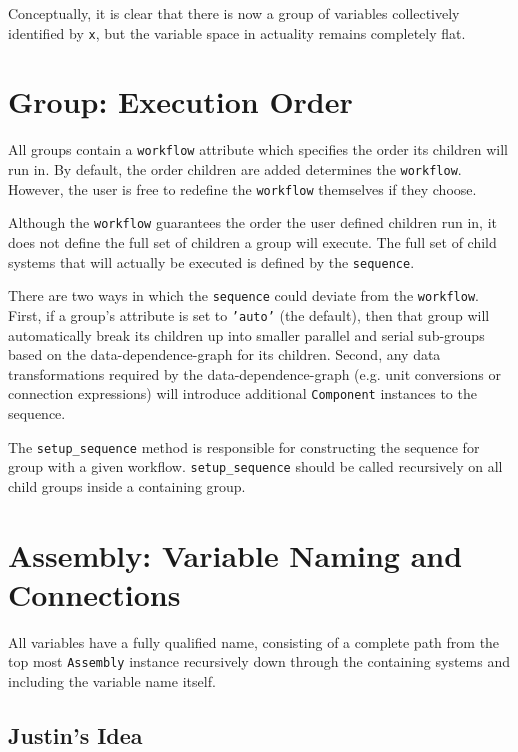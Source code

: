 \documentclass[12pt]{article}
\newcommand{\classname}[1]{\texttt{#1}}
\newcommand{\method}[1]{\texttt{#1}}
\begin{document}
Conceptually, it is clear that there is now a group of variables collectively
identified by \texttt{x}, but the variable space in actuality remains completely
flat.

\section{Group: Execution Order}
All groups contain a \texttt{workflow} attribute which specifies the order its children will run in.
By default, the order children are added determines the \texttt{workflow}.
However, the user is free to redefine the \texttt{workflow} themselves if they choose.

Although the \texttt{workflow} guarantees the order the user defined children run in, it
does not define the full set of children a group will execute. The full set of
child systems that will actually be executed is defined by the \texttt{sequence}.

There are two ways in which the \texttt{sequence} could deviate from the \texttt{workflow}.
First, if a group's  attribute is set to \texttt{'auto'} (the default),
then that group will automatically break its children up into smaller parallel and serial sub-groups
based on the data-dependence-graph for its children. Second, any data transformations required by the
data-dependence-graph (e.g. unit conversions or connection expressions) will introduce additional
\classname{Component} instances to the sequence.

The \method{setup\_sequence} method is responsible for constructing the sequence for group with a
given workflow. \method{setup\_sequence} should be called recursively on all child groups inside a
containing group.

\section{Assembly: Variable Naming and Connections}
All variables have a fully qualified name, consisting of a complete path from the top most
\classname{Assembly} instance recursively down through the containing systems and including
the variable name itself.

\subsection{Justin's Idea}
\end{document}
